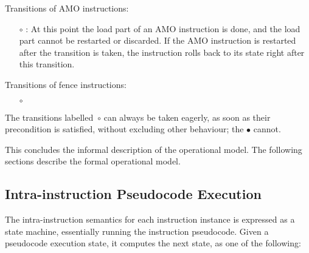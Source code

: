 \noindent Transitions of AMO instructions:
\begin{itemize}
\item[$\circ$] : At this point the load part of an AMO instruction is done, and the load part cannot be restarted or discarded. If the AMO instruction is restarted after the transition is taken, the instruction rolls back to its state right after this transition.
\end{itemize}

\noindent Transitions of fence instructions:
\begin{itemize}
\item[$\circ$] 
\end{itemize}

\begin{commentary}
The transitions labelled~$\circ$ can always be taken eagerly, as soon as their precondition is satisfied, without excluding other behaviour; the $\bullet$ cannot.
\end{commentary}

This concludes the informal description of the operational model.
The following sections describe the formal operational model.

\subsection{Intra-instruction Pseudocode Execution}
The intra-instruction semantics for each instruction instance is expressed as a state machine, essentially running the instruction pseudocode.
Given a pseudocode execution state, it computes the next state, as one of the following:

